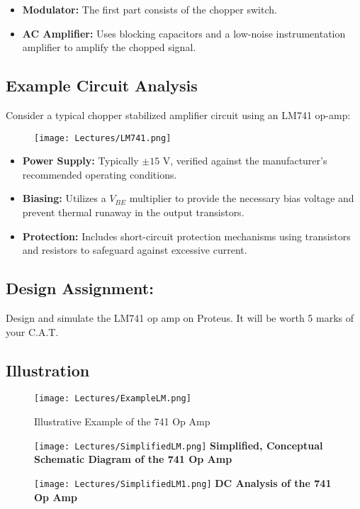 \documentclass[a4paper,9pt,twoside,openany,twocolumn]{memoir}
\begin{document}
\begin{itemize}
    \item \textbf{Modulator:} The first part consists of the chopper switch.
    \item \textbf{AC Amplifier:} Uses blocking capacitors and a low-noise instrumentation amplifier to amplify the chopped signal.
\end{itemize}

\subsection{Example Circuit Analysis}
Consider a typical chopper stabilized amplifier circuit using an LM741 op-amp:

\begin{figure}[h!]
    \centering
    \texttt{[image: Lectures/LM741.png]}

    \label{fig:example_centered}
\end{figure}
\begin{itemize}
    \item \textbf{Power Supply:} Typically $\pm15$ V, verified against the manufacturer's recommended operating conditions.
    \item \textbf{Biasing:} Utilizes a $V_{BE}$ multiplier to provide the necessary bias voltage and prevent thermal runaway in the output transistors.
    \item \textbf{Protection:} Includes short-circuit protection mechanisms using transistors and resistors to safeguard against excessive current.
\end{itemize}
\subsection{Design Assignment:}
Design and simulate the LM741 op amp on Proteus. It will be worth 5 marks of your C.A.T.
\subsection{Illustration}

\begin{figure}[H]
    \centering
    \texttt{[image: Lectures/ExampleLM.png]}
    \caption{Illustrative Example of the 741 Op Amp}
    \label{fig:example_centered}
\end{figure}

\begin{figure}[H]
    \centering
    \begin{minipage}[t]{0.45\textwidth}
        \centering
        \texttt{[image: Lectures/SimplifiedLM.png]}
        \small \textbf{Simplified, Conceptual Schematic Diagram of the 741 Op Amp}
    \end{minipage}%
    \hfill
    \begin{minipage}[t]{0.45\textwidth}
        \centering
        \texttt{[image: Lectures/SimplifiedLM1.png]}
        \small \textbf{DC Analysis of the 741 Op Amp}
    \end{minipage}
\end{figure}
\end{document}
